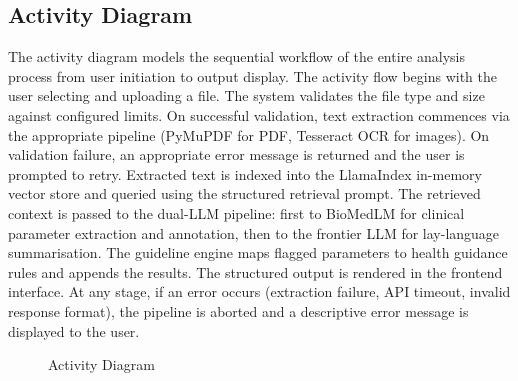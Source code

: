 \subsection{Activity Diagram}
The activity diagram models the sequential workflow of the entire analysis process from user initiation to output display. The activity flow begins with the user selecting and uploading a file. The system validates the file type and size against configured limits. On successful validation, text extraction commences via the appropriate pipeline (PyMuPDF for PDF, Tesseract OCR for images). On validation failure, an appropriate error message is returned and the user is prompted to retry. Extracted text is indexed into the LlamaIndex in-memory vector store and queried using the structured retrieval prompt. The retrieved context is passed to the dual-LLM pipeline: first to BioMedLM for clinical parameter extraction and annotation, then to the frontier LLM for lay-language summarisation. The guideline engine maps flagged parameters to health guidance rules and appends the results. The structured output is rendered in the frontend interface. At any stage, if an error occurs (extraction failure, API timeout, invalid response format), the pipeline is aborted and a descriptive error message is displayed to the user.

\begin{figure}[h]
    \centering
    \caption{Activity Diagram}
\end{figure}

